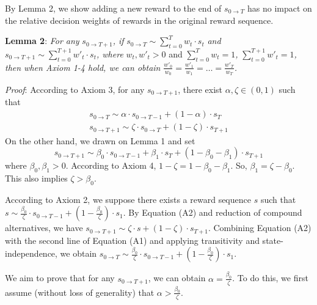 By Lemma 2, we show adding a new reward to the end of
\(s_{0\rightarrow T}\) has no impact on the relative decision weights of
rewards in the original reward sequence.

\noindent \textbf{Lemma 2}: \emph{For any}
\(s_{0\rightarrow T+1}\)\emph{, if}
\(s_{0\rightarrow T}\sim \sum_{t=0}^T w_t \cdot s_t\) \emph{and}
\(s_{0\rightarrow T+1} \sim \sum_{t=0}^{T+1} w'_t\cdot s_t\)\emph{,
where} \(w_t, w'_t>0\) and \(\sum_{t=0}^Tw_t=1\)\emph{,}
\(\sum_{t=0}^{T+1}w'_t=1\)\emph{, then when Axiom 1-4 hold, we can
obtain} \(\frac{w'_0}{w_0}=\frac{w'_1}{w_1}=…=\frac{w'_T}{w_T}\)\emph{.}

\noindent \emph{Proof}: According to Axiom 3, for any
\(s_{0\rightarrow T+1}\), there exist \(\alpha,\zeta \in (0,1)\) such
that\[\tag{A1}
\begin{aligned}
s_{0 \rightarrow T}\sim\alpha\cdot s_{0 \rightarrow T-1} + (1-\alpha)\cdot s_T \\
s_{0\rightarrow T+1} \sim \zeta\cdot s_{0\rightarrow T} + (1-\zeta)\cdot s_{T+1}
\end{aligned}
\]On the other hand, we drawn on Lemma 1 and set\[\tag{A2}
s_{0\rightarrow T+1} \sim \beta_0\cdot s_{0 \rightarrow T-1} + \beta_1\cdot s_T + (1-\beta_0-\beta_1)\cdot s_{T+1}
\]where \(\beta_0, \beta_1 > 0\). According to Axiom 4,
\(1-\zeta=1-\beta_0-\beta_1\). So, \(\beta_1=\zeta-\beta_0\). This also
implies \(\zeta > \beta_0\).

According to Axiom 2, we suppose there exists a reward sequence \(s\)
such that
\(s \sim \frac{\beta_0}{\zeta}\cdot s_{0 \rightarrow T-1} + (1-\frac{\beta_0}{\zeta})\cdot s_1\).
By Equation (A2) and reduction of compound alternatives, we have
\(s_{0\rightarrow T+1}\sim \zeta \cdot s + (1-\zeta)\cdot s_{T+1}\).
Combining Equation (A2) with the second line of Equation (A1) and
applying transitivity and state-independence, we obtain
\(s_{0\rightarrow T} \sim \frac{\beta_0}{\zeta}\cdot s_{0 \rightarrow T-1} + (1-\frac{\beta_0}{\zeta})\cdot s_1\).

We aim to prove that for any \(s_{0\rightarrow T+1}\), we can obtain
\(\alpha=\frac{\beta_0}{\zeta}\). To do this, we first assume (without
loss of generality) that \(\alpha > \frac{\beta_0}{\zeta}\).

